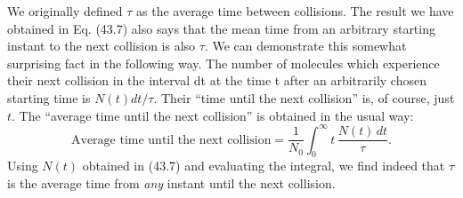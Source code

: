 \begin{subappendices}
We originally defined $\tau$ as the average time between collisions. The result we have obtained in Eq. (43.7) also says that the mean time from an arbitrary starting instant to the next collision is also $\tau$. We can demonstrate this somewhat surprising fact in the following way. The number of molecules which experience their next collision in the interval dt at the time t after an arbitrarily chosen starting time is $N(t)dt/\tau$. Their ``time until the next collision'' is, of course, just $t$. The ``average time until the next collision'' is obtained in the usual way:
\begin{equation*}
\text{Average time until the next collision} =
\frac{1}{N_0}\int_0^\infty t\,\frac{N(t)\,dt}{\tau}.
\end{equation*}
%
Using $N(t)$ obtained in (43.7) and evaluating the integral, we find indeed that $\tau$ is the average time from \emph{any} instant until the next collision.
\end{subappendices}

